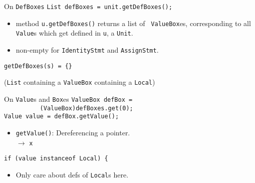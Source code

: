 \begin{slide}{On {\tt DefBoxes}}
\vspace*{-0.1in}
{\tt List defBoxes = unit.getDefBoxes();}

\vspace*{-0.05in}
\begin{itemize}
\item method {\green \tt u.getDefBoxes()} returns a list of {\tt
ValueBox}es, corresponding to all {\tt Value}s which get defined
in {\tt u}, a {\tt Unit}. 

\item non-empty for {\tt IdentityStmt} and {\tt AssignStmt}.
\end{itemize}

\vspace*{-0.08in}
\begin{center}
\end{center}

\vspace*{0.05in}
{\tt getDefBoxes(s) = \{\}}\\
\qquad \qquad \begin{minipage}{0.7\textwidth} 
({\tt List} containing a {\tt ValueBox} containing a {\tt Local})
\end{minipage}

\end{slide}

\begin{slide}{On {\tt Value}s and {\tt Box}es}
\verb+ValueBox defBox = +\\
\verb+          (ValueBox)defBoxes.get(0);+\\
{\green \verb+Value value = defBox.getValue();+}

\begin{itemize}
\item {\tt getValue()}: Dereferencing a pointer.\\
\qquad \qquad \qquad \qquad {} $\rightarrow$ {\tt x}
\end{itemize}

\verb+if (value instanceof Local) {+

\begin{itemize}
\item Only care about defs of {\tt Local}s here.
\end{itemize}
\end{slide}

